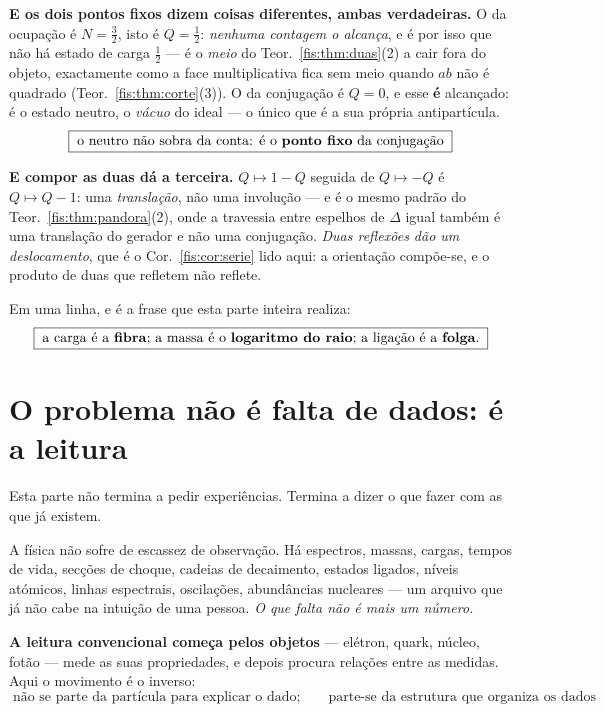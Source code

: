 \documentclass[livro.tex]{subfiles}
\begin{document}
\medskip\noindent\textbf{E os dois pontos fixos dizem coisas diferentes, ambas
verdadeiras.} O da ocupação é $N=\tfrac32$, isto é $Q=\tfrac12$: \emph{nenhuma
contagem o alcança}, e é por isso que não há estado de carga $\tfrac12$ --- é o
\emph{meio} do Teor.~\ref{fis:thm:duas}(2) a cair fora do objeto, exactamente como
a face multiplicativa fica sem meio quando $ab$ não é quadrado
(Teor.~\ref{fis:thm:corte}(3)). O da conjugação é $Q=0$, e esse \textbf{é} alcançado: é o estado neutro, o \emph{vácuo} do ideal --- o único
que é a sua própria antipartícula.
\[
\boxed{\;\text{o neutro não sobra da conta: é o \textbf{ponto fixo} da conjugação}\;}
\]

\medskip\noindent\textbf{E compor as duas dá a terceira.} $Q\mapsto1-Q$ seguida
de $Q\mapsto-Q$ é $Q\mapsto Q-1$: uma \emph{translação}, não uma involução ---
e é o mesmo padrão do Teor.~\ref{fis:thm:pandora}(2), onde a travessia entre
espelhos de $\Delta$ igual também é uma translação do gerador e não uma
conjugação. \emph{Duas reflexões dão um deslocamento}, que é o
Cor.~\ref{fis:cor:serie} lido aqui: a orientação compõe-se, e o produto de duas
que refletem não reflete.

\medskip\noindent Em uma linha, e é a frase que esta parte inteira realiza:
\[
\boxed{\;\text{a carga é a \textbf{fibra}; a massa é o \textbf{logaritmo do
raio}; a ligação é a \textbf{folga}.}\;}
\]

\section{O problema não é falta de dados: é a leitura}\label{fis:leitura-dados}

\noindent Esta parte não termina a pedir experiências. Termina a dizer o que
fazer com as que já existem.

\medskip\noindent A física não sofre de escassez de observação. Há espectros,
massas, cargas, tempos de vida, secções de choque, cadeias de decaimento,
estados ligados, níveis atómicos, linhas espectrais, oscilações, abundâncias
nucleares --- um arquivo que já não cabe na intuição de uma pessoa. \emph{O que
falta não é mais um número.}

\medskip\noindent\textbf{A leitura convencional começa pelos objetos} ---
elétron, quark, núcleo, fotão --- mede as suas propriedades, e depois procura
relações entre as medidas. Aqui o movimento é o inverso:
\[
\boxed{\;\text{não se parte da partícula para explicar o dado;}\qquad
\text{parte-se da estrutura que organiza os dados}\;}
\]
\end{document}
